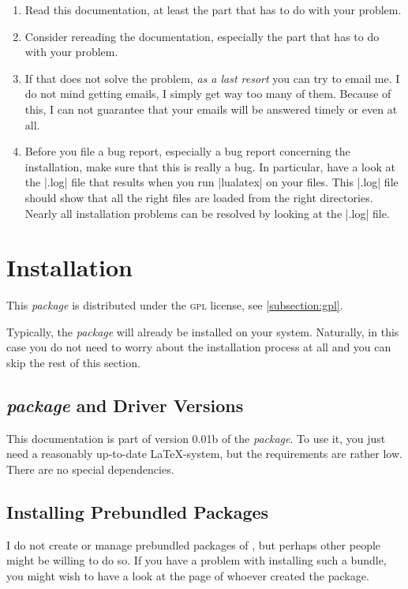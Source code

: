 \documentclass{simurgh-doc}
\begin{document}
\begin{enumerate}
  \item Read this documentation, at least the part that has to do with your problem.
  \item Consider rereading the documentation, especially the part that has to do with your problem.
  \item If that does not solve the problem, \emph{as a last resort} you can try to email me. I do not mind getting emails, I simply get way too many of them. Because of this, I can not guarantee that your emails will be answered timely or even at all. 
  \item Before you file a bug report, especially a bug report concerning the installation, make sure that this is really a bug. In particular, have a look at the |.log| file that results when you run |lualatex| on your files. This |.log| file should show that all the right files are loaded from the right directories. Nearly all installation problems can be resolved by looking at the |.log| file.
\end{enumerate}

\section{Installation}

This \textit{package} is distributed under the \textsc{gpl} license, see \autoref{subsection:gpl}. 

Typically, the \textit{package} will already be installed on your system. Naturally, in this case you do not need to worry about the installation process at all and you can skip the rest of this section. 

\subsection{\textit{package} and Driver Versions}

This documentation is part of version 0.01b of the \simurgh{} \textit{package}. To use it, you just need a reasonably up-to-date \LaTeX-system, but the requirements are rather low. There are no special dependencies.

\subsection{Installing Prebundled Packages}

I do not create or manage prebundled packages of \simurgh, but perhaps other people might be willing to do so. If you have a problem with installing such a bundle, you might wish to have a look at the page of whoever created the package.
\end{document}
